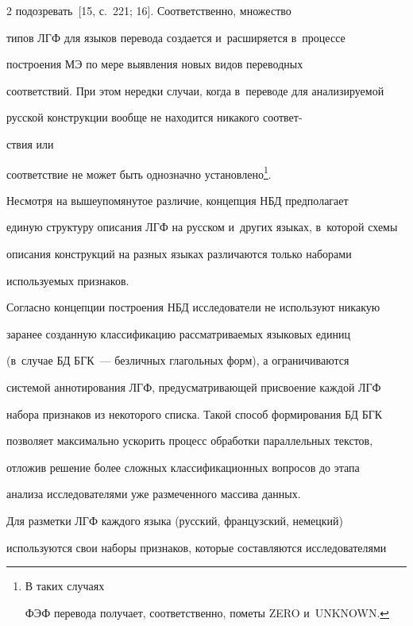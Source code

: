 \begin{multicols}{2}
подозревать~[15, с.~221; 16]. Соответственно, множество 

типов ЛГФ для языков перевода создается и~расширяется в~процессе 

построения МЭ по мере выявления новых видов переводных 

соответствий. При этом нередки случаи, когда в~переводе для анализируемой 

русской конструкции вообще не находится никакого соответ-\linebreak\vspace*{-12pt}



\pagebreak



\noindent

ствия или 

соответствие не может быть однозначно установлено\footnote[1]{В таких случаях 

ФЭФ перевода получает, соответственно, пометы ZERO и~UNKNOWN.}.

  

  Несмотря на вышеупомянутое различие, концепция НБД предполагает 

единую структуру описания ЛГФ на русском и~других языках, в~которой схемы 

описания конструкций на разных языках различаются только наборами 

используемых признаков. 

  

  Согласно концепции построения НБД исследователи не используют никакую 

заранее созданную классификацию рассматриваемых языковых единиц 

(в~случае БД БГК~--- безличных глагольных форм), а ограничиваются 

системой аннотирования ЛГФ, предусматривающей присвоение каждой ЛГФ 

набора признаков из некоторого списка. Такой способ формирования БД БГК 

позволяет максимально ускорить процесс обработки параллельных текстов, 

отложив решение более сложных классификационных вопросов до этапа 

анализа исследователями уже размеченного массива данных.

  

  Для разметки ЛГФ каждого языка (русский, французский, немецкий) 

используются свои наборы признаков, которые составляются исследователями 


\end{multicols}
